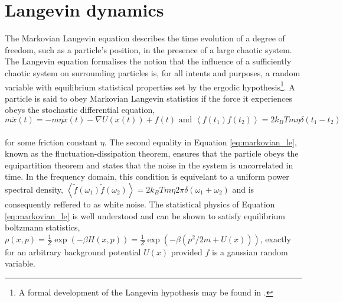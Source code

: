 \documentclass{article}
\begin{document}
\section{Langevin dynamics} \label{sec:langevin}

The Markovian Langevin equation describes the time evolution of a degree of freedom, such as a particle's position, in the presence of a large chaotic system. The Langevin equation formalises the notion that the influence of a sufficiently chaotic system on surrounding particles is, for all intents and purposes, a random variable with equilibrium statistical properties set by the ergodic hypothesis\footnote{A formal development of the Langevin hypothesis may be found in \cite{Kramers}.}. A particle is said to obey Markovian Langevin statistics if the force it experiences obeys the stochastic differential equation,
\\
\begin{equation}
	\label{eq:markovian_le}
	m\ddot{x}(t)=-m\eta\dot{x}(t) - \nabla U(x(t)) + f(t) \text{ and } \left<f(t_1)f(t_2)\right>=2k_BTm\eta\delta(t_1 - t_2)
\end{equation}
\\
for some friction constant $\eta$. The second equality in Equation \ref{eq:markovian_le}, known as the fluctuation-dissipation theorem, ensures that the particle obeys the equipartition theorem and states that the noise in the system is uncorrelated in time. In the frequency domain, this condition is equivelant to a uniform power spectral density, $\left<\tilde{f}(\omega_1)\tilde{f}(\omega_2)\right>=2k_BTm\eta2\pi\delta(\omega_1 + \omega_2)$ and is consequently reffered to as white noise. The statistical physics of Equation \ref{eq:markovian_le} is well understood and can be shown to satisfy equilibrium boltzmann statistics, $\rho(x, p)=\frac{1}{Z}\exp(-\beta H(x, p))=\frac{1}{Z}\exp(-\beta(p^2/2m + U(x)))$, exactly for an arbitrary background potential $U(x)$ provided $f$ is a gaussian random variable.
\end{document}
